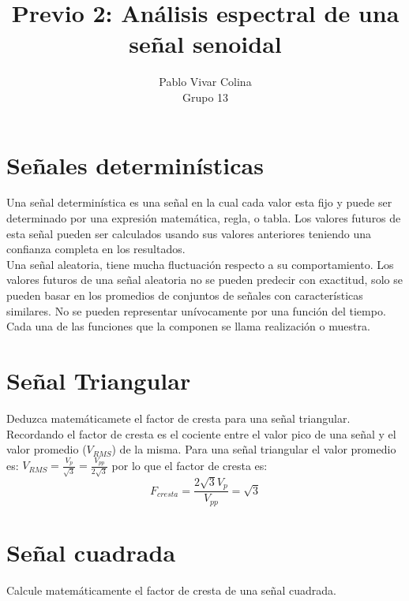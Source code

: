 \documentclass{article}
\title{Previo 2: Análisis espectral de una señal senoidal}
\author{Pablo Vivar Colina\\
Grupo 13
}
\begin{document}
\maketitle

\section{Señales determinísticas}

Una señal determinística es una señal en la cual cada valor esta fijo y puede ser determinado por una expresión matemática, regla, o tabla. Los valores futuros de esta señal pueden ser calculados usando sus valores anteriores teniendo una confianza completa en los resultados.\citep{SenialesDeterministicas}\\

Una señal aleatoria, tiene mucha fluctuación respecto a su comportamiento. Los valores futuros de una señal aleatoria no se pueden predecir con exactitud, solo se pueden basar en los promedios de conjuntos de señales con características similares. No se pueden representar unívocamente por una función del tiempo. Cada una de las funciones que la componen se llama realización o muestra.\citep{SenialesDeterministicas}\\

\section{Señal Triangular}

Deduzca matemáticamete el factor de cresta para una señal triangular.\\

Recordando el factor de cresta es el cociente entre el valor pico de una señal y el valor promedio ($V_{RMS}$) de la misma. Para una señal triangular el valor promedio es: $V_{RMS}=\frac{V_p}{\sqrt{3}}=\frac{V_{pp}}{2\sqrt{3}}$ por lo que el factor de cresta es:\\

\begin{equation}
    F_{cresta}=\frac{2\sqrt{3}V_p}{V_{pp}}=\sqrt{3}
\end{equation}

\section{Señal cuadrada}

Calcule matemáticamente el factor de cresta de una señal cuadrada.\\
\end{document}
